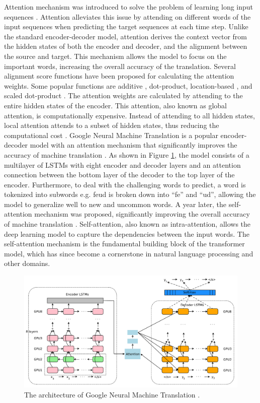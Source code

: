 \documentclass[preprint,12pt]{elsarticle}
\begin{document}
Attention mechanism was introduced to solve the problem of learning long input sequences \citep{bahdanau_neural_2014}. Attention alleviates this issue by attending on different words of the input sequences when predicting the target sequences at each time step. Unlike the standard encoder-decoder model, attention derives the context vector from the hidden states of both the encoder and decoder, and the alignment between the source and target. This mechanism allows the model to focus on the important words, increasing the overall accuracy of the translation. Several alignment score functions have been proposed for calculating the attention weights. Some popular functions are additive \citep{bahdanau_neural_2014}, dot-product, location-based \citep{luong_effective_2015}, and scaled dot-product \citep{vaswani_attention_2023}. The attention weights are calculated by attending to the entire hidden states of the encoder. This attention, also known as global attention, is computationally expensive. Instead of attending to all hidden states, local attention attends to a subset of hidden states, thus reducing the computational cost \citep{luong_effective_2015}. Google Neural Machine Translation is a popular encoder-decoder model with an attention mechanism that significantly improves the accuracy of machine translation \citep{wu_googles_2016}. As shown in Figure \ref{fig_nmt_GNMT}, the model consists of a multilayer of LSTMs with eight encoder and decoder layers and an attention connection between the bottom layer of the decoder to the top layer of the encoder. Furthermore, to deal with the challenging words to predict, a word is tokenized into subwords e.g. feud is broken down into ``fe'' and ``ud'', allowing the model to generalize well to new and uncommon words. A year later, the self-attention mechanism was proposed, significantly improving the overall accuracy of machine translation \citep{vaswani_attention_2023}. Self-attention, also known as intra-attention, allows the deep learning model to capture the dependencies between the input words. The self-attention mechanism is the fundamental building block of the transformer model, which has since become a cornerstone in natural language processing and other domains.

\begin{figure}[h!]
    \centering
    \includegraphics[scale=0.6]{fig_nmt_GNMT.png}
    \caption{The architecture of Google Neural Machine Translation \citep{wu_googles_2016}.}
    \label{fig_nmt_GNMT}
\end{figure}
\end{document}

